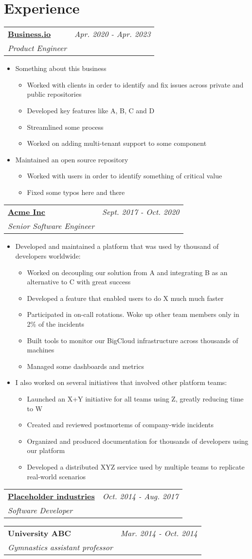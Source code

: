 \documentclass[letterpaper,11pt]{article}
\makeatletter
\newcommand{\summary}[1]{
  \item\small{
    #1 \vspace{-4pt}
  }
}
\newcommand{\heading}[3]{
  \begin{tabular*}{0.99\textwidth}[t]{l@{\extracolsep{\fill}}r}
    \textbf{#1} & \textit{\small #2} \\
    \textit{\small#3} \\
  \end{tabular*}\vspace{-2pt}
}
\newcommand{\itemListStart}{\begin{itemize}}
\newcommand{\itemListEnd}{\end{itemize}\vspace{-5pt}}
\makeatother
\begin{document}
  \section{Experience}
  \heading{\href{https://www.business.io/PLACEHOLDER}{Business.io}}{Apr. 2020 - Apr. 2023}
  {Product Engineer}
  \itemListStart
    \summary {Something about this business}
    \begin{itemize}
      \item {Worked with clients in order to identify and fix issues across private and public repositories}
      \item {Developed key features like A, B, C and D}
      \item {Streamlined some process}
      \item {Worked on adding multi-tenant support to some component}
    \end{itemize}
    \summary {Maintained an open source repository}
    \begin{itemize}
      \item {Worked with users in order to identify something of critical value}
      \item {Fixed some typos here and there}
    \end{itemize}
  \itemListEnd
  \heading{\href{https://en.wikipedia.org/wiki/PLACEHOLDER}{Acme Inc}}{Sept. 2017 - Oct. 2020}
  {Senior Software Engineer}
  \itemListStart
    \summary
    {Developed and maintained a platform that was used by thousand of developers worldwide:}
    \begin{itemize}
      \item {Worked on decoupling our solution from A and integrating B as an alternative to C with great success}
      \item {Developed a feature that enabled users to do X much much faster}
      \item {Participated in on-call rotations. Woke up other team members only in 2\% of the incidents}
      \item {Built tools to monitor our BigCloud infrastructure across thousands of machines}
      \item {Managed some dashboards and metrics}
    \end{itemize}
    \summary {I also worked on several initiatives that involved other platform teams:}
    \begin{itemize}
      \item {Launched an X+Y initiative for all teams using Z, greatly reducing time to W}
      \item {Created and reviewed postmortems of company-wide incidents}
      \item {Organized and produced documentation for thousands of developers using our platform}
      \item {Developed a distributed XYZ service used by multiple teams to replicate real-world scenarios}
    \end{itemize}
  \itemListEnd
  \heading{\href{https://page.com/PLACEHOLDER}{Placeholder industries}}{Oct. 2014 - Aug. 2017}{Software Developer}
  \heading{University ABC}{Mar. 2014 - Oct. 2014}{Gymnastics assistant professor}
\end{document}
